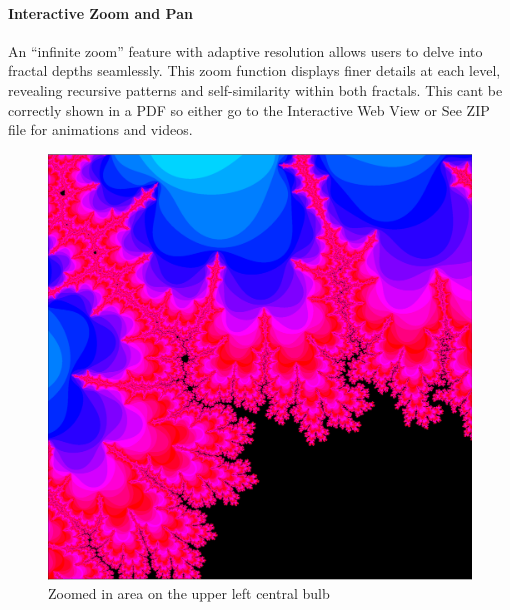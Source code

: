 \documentclass[12pt,a4paper]{report}
\begin{document}
\begin{figure}[H]
\centering

\end{figure}

\paragraph{Interactive Zoom and Pan} 
An “infinite zoom” feature with adaptive resolution allows users to delve into fractal depths seamlessly. This zoom function displays finer details at each level, revealing recursive patterns and self-similarity within both fractals. This cant be correctly shown in a PDF so either go to the Interactive Web View or See ZIP file for animations and videos.

\begin{figure}[H]
\centering
\includegraphics[width=\textwidth]{images/zoom.png}
\caption{Zoomed in area on the upper left central bulb}
\end{figure}
\end{document}
